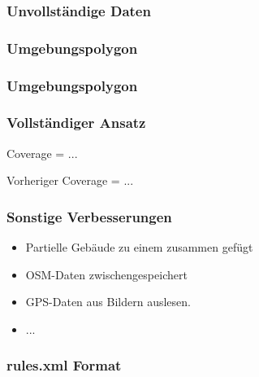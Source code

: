\begin{frame}
  \frametitle{Unvollständige Daten}
\end{frame}

\begin{frame}
  \frametitle{Umgebungspolygon}
\end{frame}

\begin{frame}
  \frametitle{Umgebungspolygon}
\end{frame}

\begin{frame}
  \frametitle{Vollständiger Ansatz}
  \begin{center}
  \huge{Coverage = ...}
  \end{center}
  \begin{center}
  Vorheriger Coverage = ...
  \end{center}
\end{frame}

\begin{frame}
  \frametitle{Sonstige Verbesserungen}
  \begin{itemize}
    \item Partielle Gebäude zu einem zusammen gefügt
    \item OSM-Daten zwischengespeichert
    \item GPS-Daten aus Bildern auslesen.
    \item ...
  \end{itemize}
\end{frame}

\begin{frame}
    \frametitle{rules.xml Format}
\end{frame}

